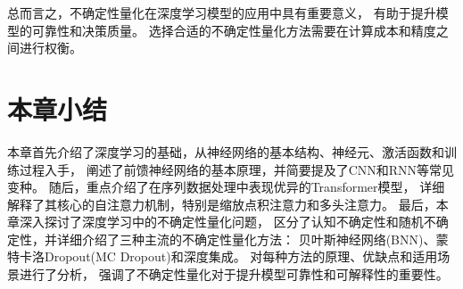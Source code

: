 总而言之，不确定性量化在深度学习模型的应用中具有重要意义，
有助于提升模型的可靠性和决策质量。
选择合适的不确定性量化方法需要在计算成本和精度之间进行权衡。

\section{本章小结}

本章首先介绍了深度学习的基础，从神经网络的基本结构、神经元、激活函数和训练过程入手，
阐述了前馈神经网络的基本原理，并简要提及了CNN和RNN等常见变种。
随后，重点介绍了在序列数据处理中表现优异的Transformer模型，
详细解释了其核心的自注意力机制，特别是缩放点积注意力和多头注意力。
最后，本章深入探讨了深度学习中的不确定性量化问题，
区分了认知不确定性和随机不确定性，并详细介绍了三种主流的不确定性量化方法：
贝叶斯神经网络(BNN)、蒙特卡洛Dropout(MC Dropout)和深度集成。
对每种方法的原理、优缺点和适用场景进行了分析，
强调了不确定性量化对于提升模型可靠性和可解释性的重要性。

